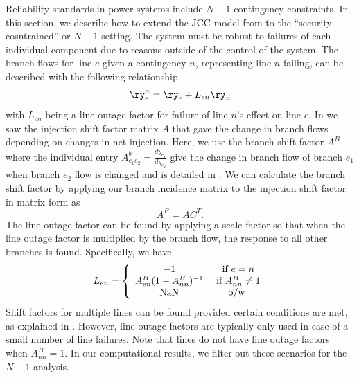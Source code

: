 Reliability standards in power systems include $N-1$ contingency constraints.  In this section, we describe how to extend the JCC model from  to the ``security-cosntrained'' or $N-1$ setting. The system must be robust to failures of each individual component due to reasons outside of the control of the system. The branch flows for line $e$ given a contingency $n$, representing line $n$ failing, can be described with the following relationship
\begin{equation}\label{n1cont}
 \ry_e^n = \ry_e + L_{e n} \ry_n 
\end{equation}
with $L_{en}$ being a line outage factor for failure of line $n$'s effect on line $e$.  In  we saw the injection shift factor matrix $A$ that gave the change in branch flows depending on changes in net injection.  Here, we use the branch shift factor $A^B$ where the individual entry $A_{e_1 e_2}^b = \frac{ dy_{e_1}}{dy_{e_2}}$ give the change in branch flow of branch $e_1$ when branch $e_2$ flow is changed and is detailed in \cite{matpower}.  We can calculate the branch shift factor by applying our branch incidence matrix to the injection shift factor in matrix form as 
\begin{equation}
A^B = A C^T.
\end{equation}
The line outage factor can be found by applying a scale factor so that when the line outage factor is multiplied by the branch flow, the response to all other branches is found.  Specifically, we have  
\begin{equation}\label{line_outage}
L_{en} = \left\{ \begin{array}{c c}
  -1 & \mbox{ if } e=n\\
  A_{en}^B (1-A_{nn}^B)^{-1} & \mbox{ if } A_{nn}^B \neq 1\\
  \mbox{NaN} & \mbox{ o/w }
  \end{array}
\right.
\end{equation}
Shift factors for multiple lines can be found provided certain conditions are met, as explained in \cite{guler_2007}.  However, line outage factors are typically only used in case of a small number of line failures.  Note that lines do not have line outage factors when $A_{nn}^B = 1$.  In our computational results, we filter out these scenarios for the $N-1$ analysis.


